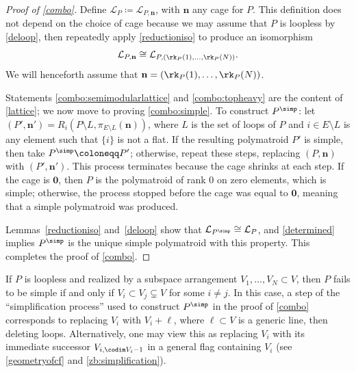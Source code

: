 \begin{proof}[Proof of \cref{combo}]
  Define $\mathcal L_P \coloneqq \mathcal L_{P, \mathbf n}$, with $\mathbf n$ any cage for $P$.
  This definition does not depend on the choice of cage because we may assume that $P$ is loopless by \cref{deloop}, then repeatedly apply \cref{reductioniso} to produce an isomorphism 
  \[
  \mathcal L_{P, \mathbf n} \cong \mathcal L_{P, (\rk_P(1), \ldots, \rk_P(N))}.
  \]
  We will henceforth assume that $\mathbf n = (\rk_P(1), \ldots, \rk_P(N))$.

  Statements \cref{combo:semimodularlattice} and \cref{combo:topheavy} are the content of \cref{lattice}; we now move to proving \cref{combo:simple}.
  To construct $P^\simp$: let $(P', \mathbf n') = R_i(P \setminus L, \pi_{E \setminus L}(\mathbf n))$, where $L$ is the set of loops of $P$ and $i \in E \setminus L$ is any element such that $\{i\}$ is not a flat.
  If the resulting polymatroid $P'$ is simple, then take $P^\simp \coloneqq P'$; otherwise, repeat these steps, replacing $(P,\mathbf n)$ with $(P', \mathbf n')$.
  This process terminates because the cage shrinks at each step.
  If the cage is $\mathbf 0$, then $P$ is the polymatroid of rank 0 on zero elements, which is simple; otherwise, the process stopped before the cage was equal to $\mathbf 0$, meaning that a simple polymatroid was produced.

  Lemmas~\ref{reductioniso} and~\ref{deloop} show that $\mathcal L_{P^\simp} \cong \mathcal L_P$, and \cref{determined} implies $P^\simp$ is the unique simple polymatroid with this property.
 This completes the proof of \cref{combo}.
\end{proof}
\begin{rema}\label{rmk:realizingreduction}
  If $P$ is loopless and realized by a subspace arrangement $V_1, \ldots, V_N \subset V$, then
  $P$ fails to be simple if and only if $V_i \subset V_j \subsetneq V$  for some $i \neq j$.
  In this case, a step of the ``simplification process'' used to construct $P^\simp$ in the proof of \cref{combo} corresponds to replacing  $V_i$ with $V_i + \ell$, where $\ell \subset V$ is a generic line, then deleting loops.
  Alternatively, one may view this as replacing $V_i$ with its immediate successor $V_{i,\codim V_i - 1}$ in a general flag containing $V_i$ (see \cref{geometryofcf} and \cref{zb:simplification}).
\end{rema}
